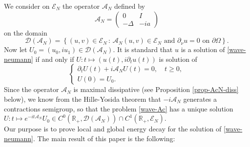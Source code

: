 \documentclass[10pt, a4paper,reqno]{amsart}
\theoremstyle{plain}
\theoremstyle{definition}
\theoremstyle{remark}
\begin{document}
We consider on ${\mathscr E_N}$ the operator ${{{\mathcal A}}_N}$ defined by 
\begin{equation} \label{def-Ac}
{{{\mathcal A}}_N} =
\begin{pmatrix} 0 & I \\ -{\Delta} & -i a \end{pmatrix}
\end{equation}
on the domain
\begin{equation} \label{dom-Ac-N}
{{\mathcal D}}({{{\mathcal A}}_N}) = {\left\{ {(u,v) \in {\mathscr E_N} {\,:\,} {{{\mathcal A}}_N} (u,v) \in {\mathscr E_N} \text{ and } \partial_{\nu} u = 0 \text{ on } \partial {\Omega}} \right\}}.
\end{equation}
Now let $U_0 = (u_0 ,iu_1) \in {{\mathcal D}}({{{\mathcal A}}_N})$. It is standard that $u$ is a solution of \eqref{wave-neumann} if and only if $U : t \mapsto (u(t),i\partial_t u(t))$ is solution of 
\begin{equation} \label{wave-Ac}
\begin{cases}
\partial_t U(t) + i {{{\mathcal A}}_N} U(t) = 0, \quad t {\geqslant} 0,\\
U(0) = U_0.
\end{cases}
\end{equation}
Since the operator ${{{\mathcal A}}_N}$ is maximal dissipative (see Proposition \ref{prop-AcN-diss} below), we know from the Hille-Yosida theorem that $-i{{{\mathcal A}}_N}$ generates a contractions semigroup, so that the problem \eqref{wave-Ac} has a unique solution $U : t \mapsto e^{-it{{{\mathcal A}}_N}} U_0 \in C^0 ({\mathbb{R}}_+,{{\mathcal D}}({{{\mathcal A}}_N})) \cap C^1({\mathbb{R}}_+,{\mathscr E_N})$.\\

Our purpose is to prove local and global energy decay for the solution of \eqref{wave-neumann}. The main result of this paper is the following:
\end{document}
